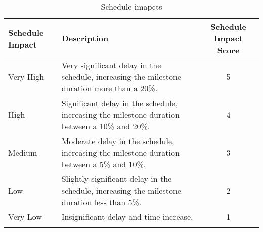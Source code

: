 \begin{longtable}[H]{l >{\raggedright\arraybackslash}p{6.6cm} c}
	
	\toprule[2pt]
	
	\textbf{Schedule Impact} &  \textbf{Description}  & \textbf{Schedule Impact Score} \\
	
	\midrule [1.5pt]
	\endhead
	
	Very High & Very significant delay in the schedule, increasing the milestone duration more than a 20\%.  & 5
	\vspace{0.2cm} \\
	
	\midrule
	
	High & Significant delay in the schedule, increasing the milestone duration between a 10\% and 20\%. & 4
	\vspace{0.2cm} \\
	
	\midrule
	
	Medium & Moderate delay in the schedule, increasing the milestone duration between a 5\% and 10\%. & 3
	\vspace{0.2cm} \\

	\midrule

	Low & Slightly significant delay in the schedule, increasing the milestone duration less than 5\%. & 2
	\vspace{0.2cm} \\

	\midrule

	Very Low & Insignificant delay and time increase. & 1
	\vspace{0.2cm} \\
		
	\bottomrule[2pt]
	
	\caption{Schedule imapcts}

\end{longtable}





